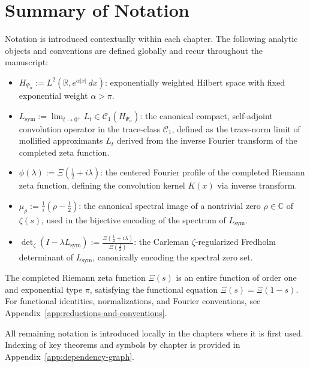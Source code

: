 \section{Summary of Notation}
\label{app:notation-summary}

\noindent
Notation is introduced contextually within each chapter. The following analytic objects and conventions are defined globally and recur throughout the manuscript:

\begin{itemize}
  \item \( H_{\Psi_\alpha} := L^2(\mathbb{R}, e^{\alpha |x|} \, dx) \): exponentially weighted Hilbert space with fixed exponential weight \( \alpha > \pi \).

  \item \( L_{\mathrm{sym}} := \lim_{t \to 0^+} L_t \in \mathcal{C}_1(H_{\Psi_\alpha}) \): the canonical compact, self-adjoint convolution operator in the trace-class \( \mathcal{C}_1 \), defined as the trace-norm limit of mollified approximants \( L_t \) derived from the inverse Fourier transform of the completed zeta function.

  \item \( \phi(\lambda) := \Xi(\tfrac{1}{2} + i\lambda) \): the centered Fourier profile of the completed Riemann zeta function, defining the convolution kernel \( K(x) \) via inverse transform.

  \item \( \mu_\rho := \frac{1}{i}(\rho - \tfrac{1}{2}) \): the canonical spectral image of a nontrivial zero \( \rho \in \mathbb{C} \) of \( \zeta(s) \), used in the bijective encoding of the spectrum of \( L_{\mathrm{sym}} \).

  \item \( \det\nolimits_\zeta(I - \lambda L_{\mathrm{sym}}) := \frac{\Xi(\tfrac{1}{2} + i\lambda)}{\Xi(\tfrac{1}{2})} \): the Carleman \(\zeta\)-regularized Fredholm determinant of \( L_{\mathrm{sym}} \), canonically encoding the spectral zero set.
\end{itemize}

\noindent
The completed Riemann zeta function \( \Xi(s) \) is an entire function of order one and exponential type \( \pi \), satisfying the functional equation \( \Xi(s) = \Xi(1 - s) \). For functional identities, normalizations, and Fourier conventions, see Appendix~\ref{app:reductions-and-conventions}.

\noindent
All remaining notation is introduced locally in the chapters where it is first used. Indexing of key theorems and symbols by chapter is provided in Appendix~\ref{app:dependency-graph}.
